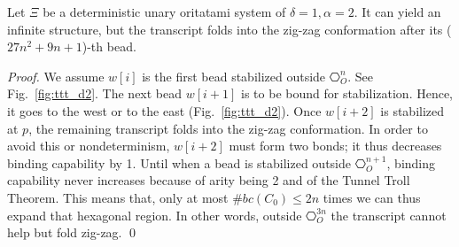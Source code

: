 \begin{theorem}[$\delta= 1, \alpha=2$]
Let $\Xi$ be a deterministic unary oritatami system of $\delta = 1, \alpha = 2$.
It can yield an infinite structure, but the transcript folds into the zig-zag conformation after its ($27n^2 + 9n +1$)-th bead.
\end{theorem}

\begin{proof}
 We assume $w[i]$ is the first bead stabilized outside $\hexagon^n_O$.
 See Fig.~\ref{fig:ttt_d2}.
 The next bead $w[i+1]$ is to be bound for stabilization.
 Hence, it goes to the west  or to the east (Fig.~\ref{fig:ttt_d2}).
 Once $w[i+2]$ is stabilized at $p$, the remaining transcript folds into the zig-zag conformation.
 In order to avoid this or nondeterminism, $w[i+2]$ must form two bonds; it thus decreases binding capability by 1.
 Until when a bead is stabilized outside $\hexagon^{n+1}_O$, binding capability never increases because of arity being 2 and of the Tunnel Troll Theorem.
 This means that, only at most $\#bc(C_0) \leq 2n$ times we can thus expand that hexagonal region.
 In other words, outside $\hexagon^{3n}_O$ the transcript cannot help but fold zig-zag. \qed
 
\end{proof}
